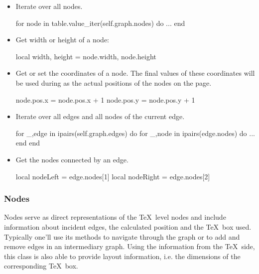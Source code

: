 \begin{itemize}
\item Iterate over all nodes.
\begin{codeexample}
for node in table.value_iter(self.graph.nodes) do
   ...
end
\end{codeexample}
\item Get width or height of a node:
\begin{codeexample}
local width, height = node.width, node.height
\end{codeexample}
\item Get or set the coordinates of a node. The final values of these
  coordinates will be used during as the actual positions of the nodes
  on the page.
\begin{codeexample}
node.pos.x = node.pos.x + 1
node.pos.y = node.pos.y + 1
\end{codeexample}
\item Iterate over all edges and all nodes of the current edge.
\begin{codeexample}
for _,edge in ipairs(self.graph.edges) do
   for _,node in ipairs(edge.nodes) do
      ...
   end
end
\end{codeexample}
\item Get the nodes connected by an edge.
\begin{codeexample}
local nodeLeft = edge.nodes[1]
local nodeRight = edge.nodes[2]
\end{codeexample}
\end{itemize}

%
%
%
%



\subsubsection{Nodes}

Nodes serve as direct representations of the \TeX\ level nodes and
include information about incident edges, the calculated position and
the \TeX\ box used.  Typically one'll use its methods to navigate
through the graph or to add and remove edges in an intermediary graph.
Using the information from the \TeX\ side, this class is also able to
provide layout information, i.e. the dimensions of the corresponding
\TeX\ box.

%


